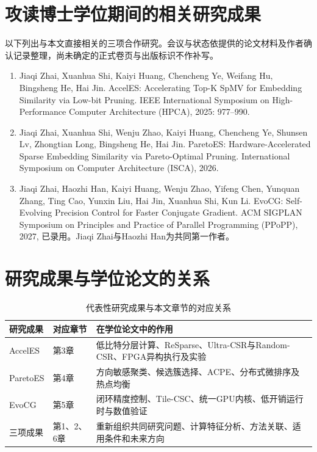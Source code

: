 \chapter{攻读博士学位期间的相关研究成果}
以下列出与本文直接相关的三项合作研究。会议与状态依提供的论文材料及作者确认记录整理，尚未确定的正式卷页与出版标识不作补写。
\begin{enumerate}
\item Jiaqi Zhai, Xuanhua Shi, Kaiyi Huang, Chencheng Ye, Weifang Hu, Bingsheng He, Hai Jin. AccelES: Accelerating Top-K SpMV for Embedding Similarity via Low-bit Pruning. IEEE International Symposium on High-Performance Computer Architecture (HPCA), 2025: 977--990.
\item Jiaqi Zhai, Xuanhua Shi, Wenju Zhao, Kaiyi Huang, Chencheng Ye, Shunsen Lv, Zhongtian Long, Bingsheng He, Hai Jin. ParetoES: Hardware-Accelerated Sparse Embedding Similarity via Pareto-Optimal Pruning. International Symposium on Computer Architecture (ISCA), 2026.
\item Jiaqi Zhai, Haozhi Han, Kaiyi Huang, Wenju Zhao, Yifeng Chen, Yunquan Zhang, Ting Cao, Yunxin Liu, Hai Jin, Xuanhua Shi, Kun Li. EvoCG: Self-Evolving Precision Control for Faster Conjugate Gradient. ACM SIGPLAN Symposium on Principles and Practice of Parallel Programming (PPoPP), 2027, 已录用。Jiaqi Zhai与Haozhi Han为共同第一作者。
\end{enumerate}

\chapter{研究成果与学位论文的关系}
\begin{table}[htbp]\centering
\caption{代表性研究成果与本文章节的对应关系}
\begin{tabularx}{\textwidth}{p{2cm}p{2.2cm}X}\toprule
研究成果&对应章节&在学位论文中的作用\\\midrule
AccelES&第3章&低比特分层计算、ReSparse、Ultra-CSR与Random-CSR、FPGA异构执行及实验\\
ParetoES&第4章&方向敏感聚类、候选簇选择、ACPE、分布式微排序及热点均衡\\
EvoCG&第5章&闭环精度控制、Tile-CSC、统一GPU内核、低开销运行时与数值验证\\
三项成果&第1、2、6章&重新组织共同研究问题、计算特征分析、方法关联、适用条件和未来方向\\\bottomrule
\end{tabularx}
\end{table}

